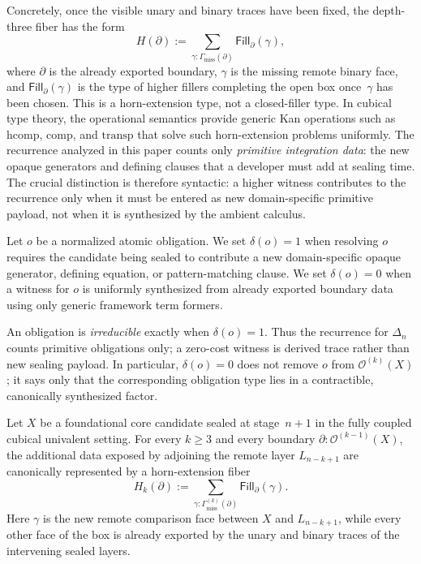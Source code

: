 \documentclass{lmcs}
\newcommand{\Ocal}{\mathcal{O}}
\newcommand{\hcomp}{\mathrm{hcomp}}
\newcommand{\compop}{\mathrm{comp}}
\newcommand{\transp}{\mathrm{transp}}
\begin{document}
Concretely, once the visible unary and binary traces have been fixed, the depth-three fiber has the form
\[
  H(\partial)
  :=
  \sum_{\gamma : \Gamma_{\mathrm{miss}}(\partial)}
  \mathsf{Fill}_{\partial}(\gamma),
\]
where $\partial$ is the already exported boundary, $\gamma$ is the missing remote binary face, and $\mathsf{Fill}_{\partial}(\gamma)$ is the type of higher fillers completing the open box once~$\gamma$ has been chosen. This is a horn-extension type, not a closed-filler type. In cubical type theory, the operational semantics provide generic Kan operations such as $\hcomp$, $\compop$, and $\transp$ that solve such horn-extension problems uniformly. The recurrence analyzed in this paper counts only \emph{primitive integration data}: the new opaque generators and defining clauses that a developer must add at sealing time. The crucial distinction is therefore syntactic: a higher witness contributes to the recurrence only when it must be entered as new domain-specific primitive payload, not when it is synthesized by the ambient calculus.

\begin{defi}
\label{def:primitive-cost}
Let $o$ be a normalized atomic obligation. We set $\delta(o)=1$ when resolving $o$ requires the candidate being sealed to contribute a new domain-specific opaque generator, defining equation, or pattern-matching clause. We set $\delta(o)=0$ when a witness for $o$ is uniformly synthesized from already exported boundary data using only generic framework term formers.

An obligation is \emph{irreducible} exactly when $\delta(o)=1$. Thus the recurrence for $\Delta_n$ counts primitive obligations only; a zero-cost witness is derived trace rather than new sealing payload. In particular, $\delta(o)=0$ does not remove $o$ from $\Ocal^{(k)}(X)$; it says only that the corresponding obligation type lies in a contractible, canonically synthesized factor.
\end{defi}

\begin{lem}
\label{lem:horn-reduction}
Let $X$ be a foundational core candidate sealed at stage~$n+1$ in the fully coupled cubical univalent setting. For every $k \geq 3$ and every boundary $\partial : \Ocal^{(k-1)}(X)$, the additional data exposed by adjoining the remote layer $L_{n-k+1}$ are canonically represented by a horn-extension fiber
\[
  H_k(\partial)
  :=
  \sum_{\gamma : \Gamma^{(k)}_{\mathrm{miss}}(\partial)}
  \mathsf{Fill}_{\partial}(\gamma).
\]
Here $\gamma$ is the new remote comparison face between $X$ and $L_{n-k+1}$, while every other face of the box is already exported by the unary and binary traces of the intervening sealed layers.
\end{lem}
\end{document}
